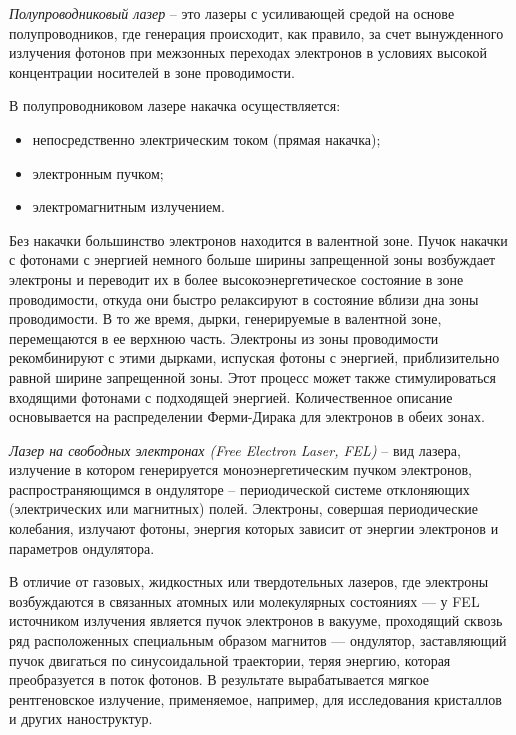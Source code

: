

\emph{Полупроводниковый лазер} -- это лазеры с усиливающей средой на основе 
полупроводников, где генерация происходит, как правило, за счет вынужденного 
излучения фотонов при межзонных переходах электронов в условиях высокой 
концентрации носителей в зоне проводимости. 

В полупроводниковом лазере накачка осуществляется:
\begin{itemize}
	\item непосредственно электрическим током (прямая накачка);
    \item электронным пучком;
    \item электромагнитным излучением.
\end{itemize}

Без накачки большинство электронов находится в валентной зоне. Пучок накачки 
с фотонами с энергией немного больше ширины запрещенной зоны возбуждает 
электроны и переводит их в более высокоэнергетическое состояние в зоне 
проводимости, откуда они быстро релаксируют в состояние вблизи дна зоны 
проводимости. В то же время, дырки, генерируемые в валентной зоне, перемещаются 
в ее верхнюю часть. Электроны из зоны проводимости рекомбинируют с этими 
дырками, испуская фотоны с энергией, приблизительно равной ширине запрещенной 
зоны. Этот процесс может также стимулироваться входящими фотонами с подходящей 
энергией. Количественное описание основывается на распределении Ферми-Дирака 
для электронов в обеих зонах.


\emph{Лазер на свободных электронах (Free Electron Laser, FEL)} -- вид лазера, 
излучение в котором генерируется моноэнергетическим пучком электронов, 
распространяющимся в ондуляторе -- периодической системе отклоняющих 
(электрических или магнитных) полей. Электроны, совершая периодические колебания, 
излучают фотоны, энергия которых зависит от энергии электронов и параметров 
ондулятора.

В отличие от газовых, жидкостных или твердотельных лазеров, где электроны 
возбуждаются в связанных атомных или молекулярных состояниях — у FEL источником 
излучения является пучок электронов в вакууме, проходящий сквозь ряд расположенных 
специальным образом магнитов — ондулятор, заставляющий пучок двигаться по 
синусоидальной траектории, теряя энергию, которая преобразуется в поток фотонов. В 
результате вырабатывается мягкое рентгеновское излучение, применяемое, например, для 
исследования кристаллов и других наноструктур.

